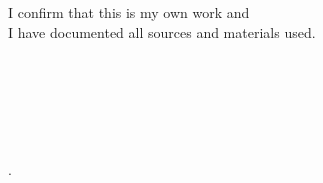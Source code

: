 \thispagestyle{empty}
\vspace*{0.6\textheight}
\noindent

\begin{framed}
I confirm that this \getDoctype{} is my own work and \\ I have documented all sources and materials used.\\ \\ \\ \\ \\ \\
\vspace{10mm}
\noindent
\getAuthor{}
\\
\getSubmissionLocation{}. \getSubmissionDate{} 
\end{framed}

\cleardoublepage{}
